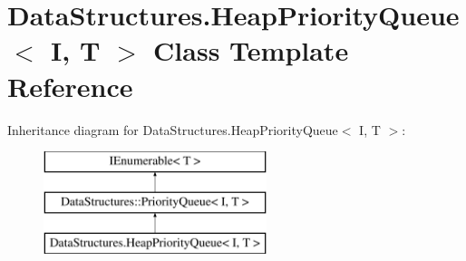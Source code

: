 \hypertarget{class_data_structures_1_1_heap_priority_queue}{}\section{Data\+Structures.\+Heap\+Priority\+Queue$<$ I, T $>$ Class Template Reference}
\label{class_data_structures_1_1_heap_priority_queue}
Inheritance diagram for Data\+Structures.\+Heap\+Priority\+Queue$<$ I, T $>$\+:\begin{figure}[H]
\begin{center}
\leavevmode
\includegraphics[height=3.000000cm]{class_data_structures_1_1_heap_priority_queue}
\end{center}
\end{figure}
